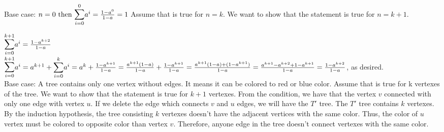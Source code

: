 \documentclass[12pt,twoside]{article}
\begin{document}
\begin{problems}
\problem  %
Base case:
$n=0 \text{ then } \mathlarger{\mathlarger{\sum}}_{i=0}^{0}a^{i}=\frac{1-a^{0}}{1-a} = 1$ Assume that is true for $n=k$. We want to show that the statement is true for $n=k+1$.

$\mathlarger{\mathlarger{\sum}}_{i=0}^{k+1}a^{i}=\frac{1-a^{k+2}}{1-a}$ \\
$\mathlarger{\mathlarger{\sum}}_{i=0}^{k+1}a^{i}=a^{k+1}+\mathlarger{\sum}_{i=0}^{k}a^{i}=a^{k}+\frac{1-a^{k+1}}{1-a}=\frac{a^{k+1}(1-a)}{1-a}+\frac{1-a^{k+1}}{1-a}=\frac{a^{k+1}(1-a)+(1-a^{k+1})}{1-a}=\frac{a^{k+1}-a^{k+2}+1-a^{k+1}}{1-a}=\frac{1-a^{k+2}}{1-a}$, as desired. \\

\problem  %
Base case: A tree contains only one vertex without edges. It means it can be colored to red or blue color. Assume that is true for k vertexes of the tree. We want to show that the statement is true for $k+1$ vertexes. From the condition, we have that the vertex $v$ connected with only one edge with vertex $u$. If we delete the edge which connects $v$
 and $u$ edges, we will have the $T'$ tree. The $T'$ tree contains $k$ vertexes. By the induction hypothesis, the tree consisting $k$ vertexes doesn't have the adjacent vertices with the same color. Thus, the color of $u$ vertex must be colored to opposite color than vertex $v$. Therefore, anyone edge in the tree doesn't connect vertexes with the same color.
 
\vfill

\end{problems}
\end{document}
